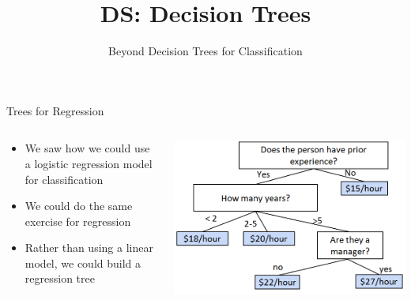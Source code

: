 \documentclass[aspectratio=169]{../latex_main/tntbeamer}  %
\title[Summary]{DS: Decision Trees}
\subtitle{Beyond Decision Trees for Classification}
\begin{document}
	
	\maketitle
	\begin{frame}{Trees for Regression}
	    \begin{columns}
	    \begin{column}{.5\textwidth}
	    
	        \begin{itemize}
	            \item We saw how we could use a logistic regression model for classification
                \item We could do the same exercise for regression
                \item Rather than using a linear model, we could build a regression tree
            \end{itemize}
        \end{column}
	    
        \begin{column}{.5\textwidth}
            
	            \centering
	            \includegraphics[scale=.4]{Bild58}

	   \end{column}
	    \end{columns}
	\end{frame}
	
	
	
\end{document}

